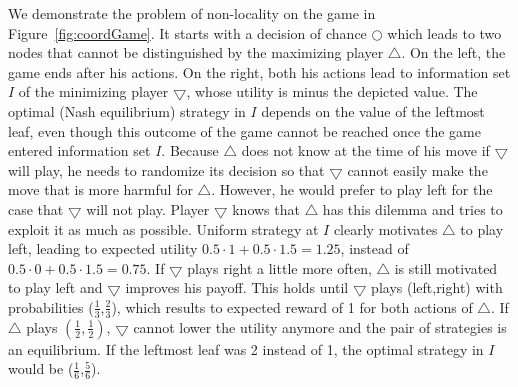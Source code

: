 \documentclass{aamas2015}
\begin{document}
We demonstrate the problem of non-locality on the game in Figure~\ref{fig:coordGame}. It starts with a decision of chance $\bigcirc$ which leads to two nodes that cannot be distinguished by the maximizing player $\bigtriangleup$. On the left, the game ends after his actions. On the right, both his actions lead to information set $I$ of the minimizing player $\bigtriangledown$, whose utility is minus the depicted value.
The optimal (Nash equilibrium) strategy in $I$ depends on the value of the leftmost leaf, even though this outcome of the game cannot be reached once the game entered information set $I$.
Because $\bigtriangleup$ does not know at the time of his move if $\bigtriangledown$ will play, he needs to randomize its decision so that $\bigtriangledown$ cannot easily make the move that is more harmful for $\bigtriangleup$. However, he would prefer to play left for the case that $\bigtriangledown$ will not play. Player $\bigtriangledown$ knows that $\bigtriangleup$ has this dilemma and tries to exploit it as much as possible. Uniform strategy at $I$ clearly motivates $\bigtriangleup$ to play left, leading to expected utility $0.5\cdot 1 + 0.5\cdot1.5 = 1.25$, instead of $0.5\cdot 0 + 0.5\cdot1.5 = 0.75$.
If $\bigtriangledown$ plays right a little more often, $\bigtriangleup$ is still motivated to play left and $\bigtriangledown$ improves his payoff. 
This holds until $\bigtriangledown$ plays (left,right) with probabilities ($\frac{1}{3}$,$\frac{2}{3}$),
which results to expected reward of 1 for both actions of $\bigtriangleup$.
If $\bigtriangleup$ plays $(\frac{1}{2},\frac{1}{2})$, $\bigtriangledown$ cannot lower the utility anymore and the pair of strategies is an equilibrium.
If the leftmost leaf was 2 instead of 1, the optimal strategy in $I$ would be ($\frac{1}{6}$,$\frac{5}{6}$).

\end{document}
